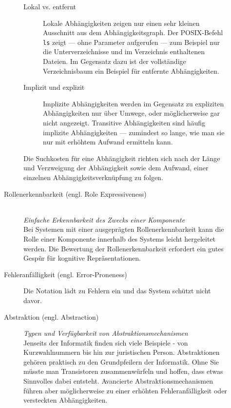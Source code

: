 \begin{important}
\begin{description}
\begin{description}
\begin{description}
            \item[Lokal vs. entfernt] Lokale Abhängigkeiten zeigen nur einen sehr kleinen Ausschnitt
            aus dem Abhängigkeitsgraph. Der POSIX-Befehl \texttt{ls} zeigt --- ohne Parameter aufgerufen --- zum
            Beispiel nur die Unterverzeichnisse und im Verzeichnis enthaltenen Dateien. Im Gegensatz dazu
            ist der vollständige Verzeichnisbaum ein Beispiel für entfernte Abhängigkeiten.

            \item[Implizit und explizit] Implizite Abhängigkeiten werden im Gegensatz zu expliziten Abhängigkeiten
            nur über Umwege, oder möglicherweise gar nicht angezeigt. Transitive Abhängigkeiten sind häufig
            implizite Abhängigkeiten --- zumindest so lange, wie man sie nur mit erhöhtem Aufwand ermitteln kann.
            
        \end{description}
        
        Die Suchkosten für eine Abhängigkeit richten sich nach der Länge und Verzweigung der Abhängigkeit sowie
        dem Aufwand, einer einzelnen Abhängigkeitsverknüpfung zu folgen.
        
        \item[Rollenerkennbarkeit (engl. Role Expressiveness)] \hfill \\ \textit{Einfache Erkennbarkeit des Zwecks einer Komponente}\\
        Bei Systemen mit einer ausgeprägten Rollenerkennbarkeit kann die Rolle einer Komponente innerhalb des Systems leicht hergeleitet werden. Die Bewertung der Rollenerkennbarkeit erfordert ein gutes Gespür für kognitive Repräsentationen. 
        \item[Fehleranfälligkeit (engl. Error-Proneness)] Die Notation lädt zu Fehlern ein und das System schützt nicht davor.
        
        \item[Abstraktion (engl. Abstraction)] \textit{Typen und Verfügbarkeit von Abstraktionsmechanismen}\\
        Jenseits der Informatik finden sich viele Beispiele - von Kurzwahlnummern bis hin zur juristischen Person. Abstraktionen gehören praktisch zu den Grundpfeilern der Informatik. Ohne Sie müsste man Transistoren zusammenwürfeln und hoffen, dass etwas Sinnvolles dabei entsteht. Avancierte Abstraktionsmechanismen führen aber möglicherweise zu einer erhöhten Fehleranfälligkeit oder versteckten Abhängigkeiten.
        

\end{description}
\end{description}
\end{important}
